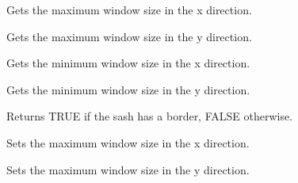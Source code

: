 \label{wxsashwindowgetmaximumsizex}


Gets the maximum window size in the x direction.

\label{wxsashwindowgetmaximumsizey}


Gets the maximum window size in the y direction.

\label{wxsashwindowgetminimumsizex}


Gets the minimum window size in the x direction.

\label{wxsashwindowgetminimumsizey}


Gets the minimum window size in the y direction.

\label{wxsashwindowhasborder}


Returns TRUE if the sash has a border, FALSE otherwise.





\label{wxsashwindowsetmaximumsizex}


Sets the maximum window size in the x direction.

\label{wxsashwindowsetmaximumsizey}


Sets the maximum window size in the y direction.

\label{wxsashwindowsetminimumsizex}


